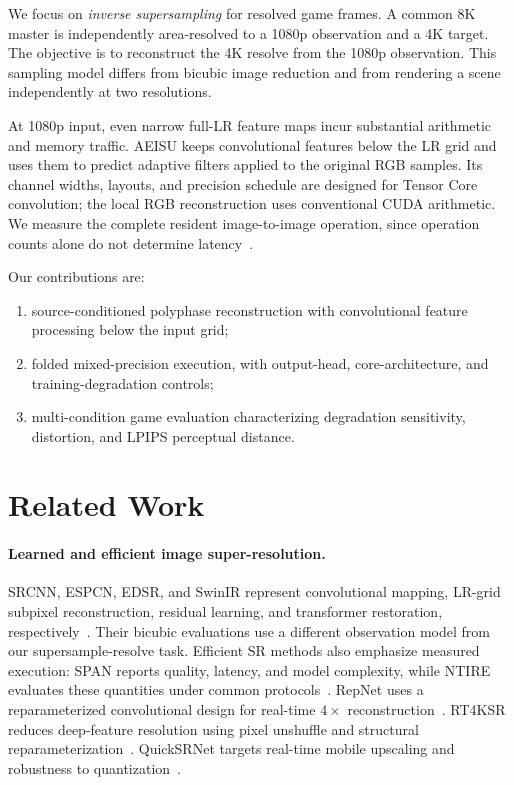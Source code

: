 \documentclass[10pt,twocolumn,letterpaper]{article}
\newcommand{\model}{AEISU}
\begin{document}
We focus on \emph{inverse supersampling} for resolved game frames.
A common 8K master is independently area-resolved to a 1080p observation and a 4K target.
The objective is to reconstruct the 4K resolve from the 1080p observation.
This sampling model differs from bicubic image reduction and from rendering a scene independently at two resolutions.

At 1080p input, even narrow full-LR feature maps incur substantial arithmetic and memory traffic.
\model{} keeps convolutional features below the LR grid and uses them to predict adaptive filters applied to the original RGB samples.
Its channel widths, layouts, and precision schedule are designed for Tensor Core convolution; the local RGB reconstruction uses conventional CUDA arithmetic.
We measure the complete resident image-to-image operation, since operation counts alone do not determine latency~\cite{wan2024span,ren2024ntire,nvidia2023gemm}.

Our contributions are:
\begin{enumerate}
  \setlength{\itemsep}{1pt}\setlength{\parskip}{0pt}
  \item source-conditioned polyphase reconstruction with convolutional feature processing below the input grid;
  \item folded mixed-precision execution, with output-head, core-architecture, and training-degradation controls;
  \item multi-condition game evaluation characterizing degradation sensitivity, distortion, and LPIPS perceptual distance.
\end{enumerate}

\section{Related Work}
\label{sec:related}
\paragraph{Learned and efficient image super-resolution.}
SRCNN, ESPCN, EDSR, and SwinIR represent convolutional mapping, LR-grid subpixel reconstruction, residual learning, and transformer restoration, respectively~\cite{dong2016srcnn,shi2016espcn,lim2017edsr,liang2021swinir}.
Their bicubic evaluations use a different observation model from our supersample-resolve task.
Efficient SR methods also emphasize measured execution: SPAN reports quality, latency, and model complexity, while NTIRE evaluates these quantities under common protocols~\cite{wan2024span,ren2024ntire}.
RepNet uses a reparameterized convolutional design for real-time $4\times$ reconstruction~\cite{conde2023repnet}.
RT4KSR reduces deep-feature resolution using pixel unshuffle and structural reparameterization~\cite{zamfir2023rt4ksr}.
QuickSRNet targets real-time mobile upscaling and robustness to quantization~\cite{berger2023quicksrnet}.
\end{document}
